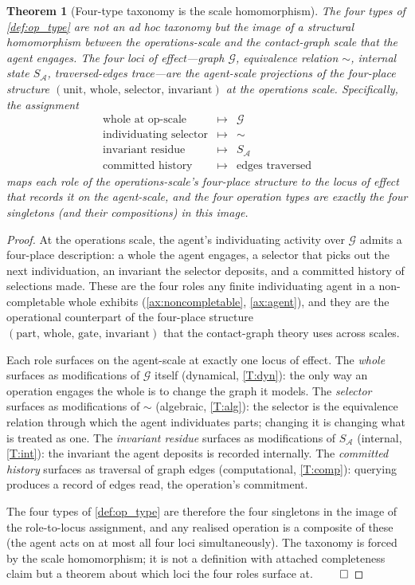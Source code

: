 \documentclass[11pt,a4paper]{article}
\theoremstyle{thmstyle}
\newtheorem{theorem}{Theorem}[section]
\theoremstyle{definition}
\theoremstyle{remark}
\newcommand{\Graph}{\mathcal{G}}
\newcommand{\Agent}{\mathcal{A}}
\begin{document}
\begin{theorem}[Four-type taxonomy is the scale homomorphism]
\label{thm:scale_homomorphism}
The four types of \cref{def:op_type} are not an ad hoc taxonomy
but the image of a structural homomorphism between the
operations-scale and the contact-graph scale that the agent
engages. The four loci of effect---graph $\Graph$, equivalence
relation $\sim$, internal state $S_\Agent$, traversed-edges
trace---are the agent-scale projections of the four-place
structure $(\text{unit},\,\text{whole},\,\text{selector},\,\text{
invariant})$ at the operations scale. Specifically, the assignment
\[
  \begin{array}{rcl}
  \text{whole at op-scale} & \longmapsto & \Graph \\
  \text{individuating selector} & \longmapsto & \sim \\
  \text{invariant residue} & \longmapsto & S_\Agent \\
  \text{committed history} & \longmapsto & \text{edges traversed}
  \end{array}
\]
maps each role of the operations-scale's four-place structure to
the locus of effect that records it on the agent-scale, and the
four operation types are exactly the four singletons (and their
compositions) in this image.
\end{theorem}

\begin{proof}
At the operations scale, the agent's individuating activity over
$\Graph$ admits a four-place description: a whole the agent
engages, a selector that picks out the next individuation, an
invariant the selector deposits, and a committed history of
selections made. These are the four roles any finite individuating
agent in a non-completable whole exhibits
(\cref{ax:noncompletable}, \cref{ax:agent}), and they are the
operational counterpart of the four-place structure
$(\text{part},\,\text{whole},\,\text{gate},\,\text{invariant})$
that the contact-graph theory uses across scales.

Each role surfaces on the agent-scale at exactly one locus of
effect. The \emph{whole} surfaces as modifications of $\Graph$
itself (dynamical, \ref{T:dyn}): the only way an operation engages
the whole is to change the graph it models. The \emph{selector}
surfaces as modifications of $\sim$ (algebraic, \ref{T:alg}): the
selector is the equivalence relation through which the agent
individuates parts; changing it is changing what is treated as one.
The \emph{invariant residue} surfaces as modifications of
$S_\Agent$ (internal, \ref{T:int}): the invariant the agent
deposits is recorded internally. The \emph{committed history}
surfaces as traversal of graph edges (computational, \ref{T:comp}):
querying produces a record of edges read, the operation's commitment.

The four types of \cref{def:op_type} are therefore the four
singletons in the image of the role-to-locus assignment, and any
realised operation is a composite of these (the agent acts on at
most all four loci simultaneously). The taxonomy is forced by the
scale homomorphism; it is not a definition with attached
completeness claim but a theorem about which loci the four roles
surface at. $\qed$
\end{proof}
\end{document}

